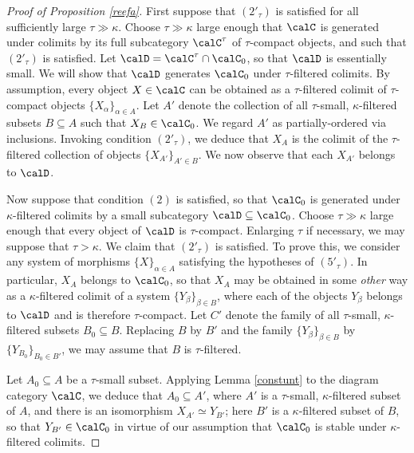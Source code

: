 \begin{Model Categories}
\begin{proof}[Proof of Proposition \ref{reefa}]
First suppose that $(2'_{\tau})$ is satisfied for all sufficiently large $\tau \gg \kappa$. Choose
$\tau \gg \kappa$ large enough that $\calC$ is generated under colimits by its full subcategory $\calC^{\tau}$ of $\tau$-compact objects, and such that $(2'_{\tau})$ is satisfied. Let 
$\calD = \calC^{\tau} \cap \calC_0$, so that $\calD$ is essentially small. We will show that
$\calD$ generates $\calC_0$ under $\tau$-filtered colimits.
By assumption, every object $X \in \calC$ can be obtained as a $\tau$-filtered colimit of $\tau$-compact objects $\{ X_{\alpha} \}_{\alpha \in A}$.
Let $A'$ denote the collection of all
$\tau$-small, $\kappa$-filtered subsets $B \subseteq A$ such that $X_{B} \in \calC_0$. 
We regard $A'$ as partially-ordered via inclusions. Invoking condition $(2'_{\tau})$, we deduce that $X_{A}$ is the colimit of the $\tau$-filtered collection of objects $\{ X_{A'} \}_{A' \in B}$. We now observe that each $X_{A'}$ belongs to $\calD$.

Now suppose that condition $(2)$ is satisfied, so that $\calC_0$ is generated under $\kappa$-filtered colimits by a small subcategory $\calD \subseteq \calC_0$. Choose
$\tau \gg \kappa$ large enough that every object of $\calD$ is $\tau$-compact. Enlarging $\tau$ if necessary, we may suppose that $\tau > \kappa$. We claim that $(2'_{\tau})$ is satisfied.
To prove this, we consider any system of morphisms $\{ X \}_{\alpha \in A}$ satisfying the hypotheses of $(5'_{\tau})$. In particular, $X_A$ belongs to
$\calC_0$, so that $X_A$ may be obtained in some {\em other} way as a $\kappa$-filtered colimit of a system $\{ Y_{\beta}  \}_{\beta \in B}$, where each of the objects $Y_{\beta}$ belongs to $\calD$ and is therefore $\tau$-compact. Let $C'$ denote the family of all $\tau$-small, $\kappa$-filtered subsets $B_0 \subseteq B$. Replacing $B$ by $B'$ and the family
$\{ Y_{\beta} \}_{\beta \in B}$ by
$\{ Y_{B_0} \}_{ B_0 \in B'}$, we may assume that $B$ is $\tau$-filtered.

Let $A_0 \subseteq A$ be a $\tau$-small subset. Applying Lemma \ref{constunt} to the diagram category $\calC$, we deduce that $A_0 \subseteq A'$, where $A'$ is a $\tau$-small, $\kappa$-filtered subset of $A$, and there is an isomorphism
$X_{A'} \simeq Y_{B'}$; here $B'$ is a $\kappa$-filtered subset of $B$, so that $Y_{B'} \in \calC_0$ in virtue of our assumption that $\calC_0$ is stable under $\kappa$-filtered colimits.
\end{proof}


\end{Model Categories}

